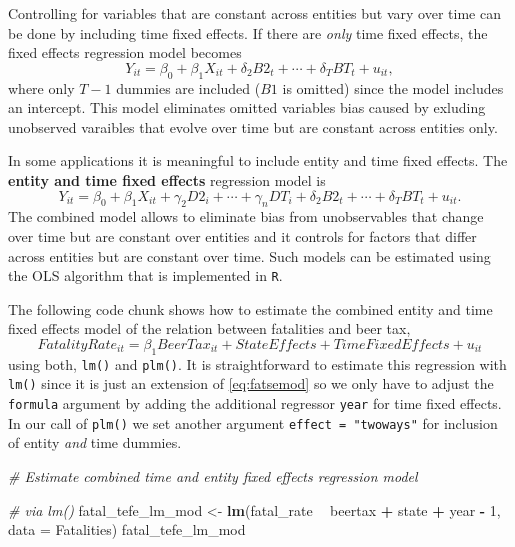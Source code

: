 \documentclass[]{book}
\newenvironment{Shaded}{\begin{snugshade}}{\end{snugshade}}
\newcommand{\KeywordTok}[1]{\textcolor[rgb]{0.13,0.29,0.53}{\textbf{#1}}}
\newcommand{\DataTypeTok}[1]{\textcolor[rgb]{0.13,0.29,0.53}{#1}}
\newcommand{\DecValTok}[1]{\textcolor[rgb]{0.00,0.00,0.81}{#1}}
\newcommand{\StringTok}[1]{\textcolor[rgb]{0.31,0.60,0.02}{#1}}
\newcommand{\CommentTok}[1]{\textcolor[rgb]{0.56,0.35,0.01}{\textit{#1}}}
\newcommand{\OperatorTok}[1]{\textcolor[rgb]{0.81,0.36,0.00}{\textbf{#1}}}
\newcommand{\NormalTok}[1]{#1}
\theoremstyle{definition}
\theoremstyle{definition}
\theoremstyle{definition}
\theoremstyle{remark}
\begin{document}
Controlling for variables that are constant across entities but vary
over time can be done by including time fixed effects. If there are
\emph{only} time fixed effects, the fixed effects regression model
becomes
\[Y_{it} = \beta_0 + \beta_1 X_{it} + \delta_2 B2_t + \cdots + \delta_T BT_t + u_{it},\]
where only \(T-1\) dummies are included (\(B1\) is omitted) since the
model includes an intercept. This model eliminates omitted variables
bias caused by exluding unobserved varaibles that evolve over time but
are constant across entities only.

In some applications it is meaningful to include entity and time fixed
effects. The \textbf{entity and time fixed effects} regression model is
\[Y_{it} = \beta_0 + \beta_1 X_{it} + \gamma_2 D2_i + \cdots + \gamma_n DT_i + \delta_2 B2_t + \cdots + \delta_T BT_t + u_{it} .\]
The combined model allows to eliminate bias from unobservables that
change over time but are constant over entities and it controls for
factors that differ across entities but are constant over time. Such
models can be estimated using the OLS algorithm that is implemented in
\texttt{R}.

The following code chunk shows how to estimate the combined entity and
time fixed effects model of the relation between fatalities and beer
tax,
\[FatalityRate_{it} = \beta_1 BeerTax_{it} + StateEffects + TimeFixedEffects + u_{it}\]
using both, \texttt{lm()} and \texttt{plm()}. It is straightforward to
estimate this regression with \texttt{lm()} since it is just an
extension of \eqref{eq:fatsemod} so we only have to adjust the
\texttt{formula} argument by adding the additional regressor
\texttt{year} for time fixed effects. In our call of \texttt{plm()} we
set another argument \texttt{effect\ =\ "twoways"} for inclusion of
entity \emph{and} time dummies.

\begin{Shaded}
\begin{Highlighting}[]
\CommentTok{# Estimate combined time and entity fixed effects regression model}

\CommentTok{# via lm()}
\NormalTok{fatal_tefe_lm_mod <-}\StringTok{ }\KeywordTok{lm}\NormalTok{(fatal_rate }\OperatorTok{~}\StringTok{ }\NormalTok{beertax }\OperatorTok{+}\StringTok{ }\NormalTok{state }\OperatorTok{+}\StringTok{ }\NormalTok{year }\OperatorTok{-}\StringTok{ }\DecValTok{1}\NormalTok{, }\DataTypeTok{data =}\NormalTok{ Fatalities)}
\NormalTok{fatal_tefe_lm_mod}
\end{Highlighting}
\end{Shaded}
\end{document}

